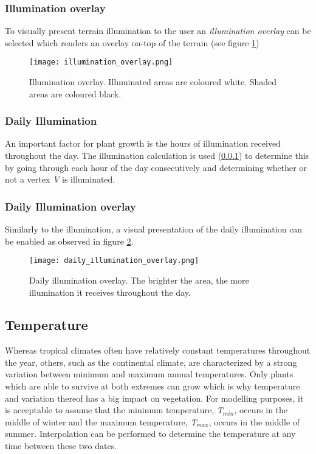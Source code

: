 \subsubsection{Illumination overlay} \label{subsub:illumination}

To visually present terrain illumination to the user an \textit{illumination overlay} can be selected which renders an overlay on-top of the terrain (see figure \ref{fig:overlay_illumination})

\begin{figure}
\center
	\texttt{[image: illumination\_overlay.png]}
	\caption{ Illumination overlay. Illuminated areas are coloured white. Shaded areas are coloured black. }
	\label{fig:overlay_illumination}
\end{figure}

\subsubsection{Daily Illumination}

An important factor for plant growth is the hours of illumination received throughout the day. The illumination calculation is used (\ref{subsub:illumination}) to determine this by going through each hour of the day consecutively and determining whether or not a vertex \textit{V} is illuminated. 

\subsubsection{Daily Illumination overlay}

Similarly to the illumination, a visual presentation of the daily illumination can be enabled as observed in figure \ref{fig:overlay_daily_illumination}.

\begin{figure}
\center
	\texttt{[image: daily\_illumination\_overlay.png]}
	\caption{ Daily illumination overlay. The brighter the area, the more illumination it receives throughout the day. }
	\label{fig:overlay_daily_illumination}
\end{figure}

\subsection{Temperature}

Whereas tropical climates often have relatively constant temperatures throughout the year, others, such as the continental climate, are characterized by a strong variation between minimum and maximum annual temperatures. Only plants which are able to survive at both extremes can grow which is why temperature and variation thereof has a big impact on vegetation. For modelling purposes, it is acceptable to assume that the minimum temperature, \textit{T$_{min}$}, occurs in the middle of winter and the maximum temperature, \textit{T$_{max}$}, occurs in the middle of summer. Interpolation can be performed to determine the temperature at any time between these two dates.\\

